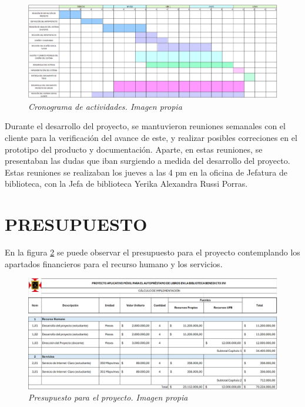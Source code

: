 \documentclass[spanish]{ieee_upb}
\begin{document}
\vspace{0.3cm}
\begin{figure}[htpb] 
	\centering
	\includegraphics[width=0.8\linewidth]{img/Cronograma-ajustado-2.png}
	\vspace{-1mm}
	\caption[Cronograma de actividades]{\textit{Cronograma de actividades. Imagen propia}}
	\label{fig:cronograma} 
\end{figure}

\vspace{0.3cm}
Durante el desarrollo del proyecto, se mantuvieron reuniones semanales con el cliente para la verificación del avance de este, y realizar posibles correciones en el prototipo del producto y documentación. Aparte, en estas reuniones, se presentaban las dudas que iban surgiendo a medida del desarrollo del proyecto. Estas reuniones se realizaban los jueves a las 4 pm en la oficina de Jefatura de biblioteca, con la Jefa de biblioteca Yerika Alexandra Russi Porras. 


\newpage
\section{\label{sec:propiedadintelectual}PRESUPUESTO}
En la figura \ref{fig:presupuesto} se puede observar el presupuesto para el proyecto contemplando los apartados financieros para el recurso humano y los servicios.

\vspace{1cm}
\begin{figure}[htpb] 
	\centering
	\includegraphics[width=0.9\linewidth]{img/presupuesto-inicial.png}
	\vspace{-1mm}
	\caption[Presupuesto para el proyecto.]{\textit{Presupuesto para el proyecto. Imagen propia}}
	\label{fig:presupuesto} 
\end{figure}
\end{document}
